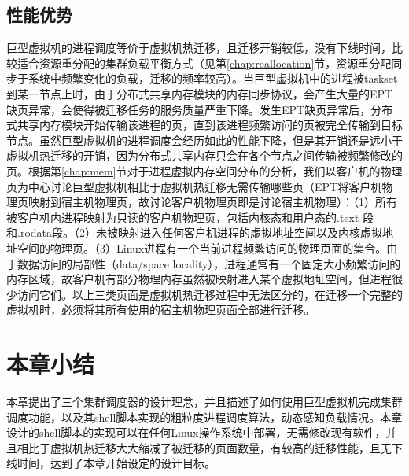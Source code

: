 \subsection{性能优势}
巨型虚拟机的进程调度等价于虚拟机热迁移，且迁移开销较低，没有下线时间，比较适合资源重分配的集群负载平衡方式（见第\ref{chap:reallocation}节，资源重分配同步于系统中频繁变化的负载，迁移的频率较高）。当巨型虚拟机中的进程被taskset到某一节点上时，由于分布式共享内存模块的内存同步协议，会产生大量的EPT缺页异常，会使得被迁移任务的服务质量严重下降。发生EPT缺页异常后，分布式共享内存模块开始传输该进程的页，直到该进程频繁访问的页被完全传输到目标节点。虽然巨型虚拟机的进程调度会经历如此的性能下降，但是其开销还是远小于虚拟机热迁移的开销，因为分布式共享内存只会在各个节点之间传输被频繁修改的页。根据第\ref{chap:mem}节对于进程虚拟内存空间分布的分析，我们以客户机的物理页为中心讨论巨型虚拟机相比于虚拟机热迁移无需传输哪些页（EPT将客户机物理页映射到宿主机物理页，故讨论客户机物理页即是讨论宿主机物理）：（1）所有被客户机内进程映射为只读的客户机物理页，包括内核态和用户态的.text 段和.rodata段。（2）未被映射进入任何客户机进程的虚拟地址空间以及内核虚拟地址空间的物理页。（3）Linux进程有一个当前进程频繁访问的物理页面的集合。由于数据访问的局部性（data/space locality），进程通常有一个固定大小频繁访问的内存区域，故客户机有部分物理内存虽然被映射进入某个虚拟地址空间，但进程很少访问它们。以上三类页面是虚拟机热迁移过程中无法区分的，在迁移一个完整的虚拟机时，必须将其所有使用的宿主机物理页面全部进行迁移。

\section{本章小结}
本章提出了三个集群调度器的设计理念，并且描述了如何使用巨型虚拟机完成集群调度功能，以及其shell脚本实现的粗粒度进程调度算法，动态感知负载情况。本章设计的shell脚本的实现可以在任何Linux操作系统中部署，无需修改现有软件，并且相比于虚拟机热迁移大大缩减了被迁移的页面数量，有较高的迁移性能，且无下线时间，达到了本章开始设定的设计目标。